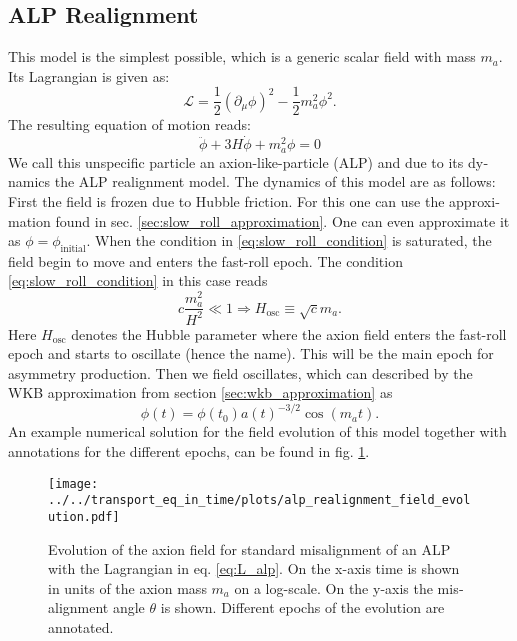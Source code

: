 \documentclass[master,       %
               twoside,        %
               BCOR10mm,       %
               english,ngerman, %
               ]{GAUBM}
\begin{document}
\begin{otherlanguage}{english}
\section{ALP Realignment}
This model is the simplest possible, which is a generic scalar field with mass $m_a$. Its Lagrangian is given as:
\begin{equation}
	\mathcal{L} = \frac{1}{2} \left( \partial_\mu \phi \right)^2 - \frac{1}{2} m_a^2 \phi^2.
	\label{eq:L_alp}
\end{equation}
The resulting equation of motion reads:
\begin{equation}
	\ddot{\phi} + 3 H \dot{\phi} + m_a^2 \phi = 0
\end{equation}
We call this unspecific particle an axion-like-particle (ALP) and due to its dynamics the ALP realignment model.
The dynamics of this model are as follows:
First the field is frozen due to Hubble friction. For this one can use the approximation found in sec. \ref{sec:slow_roll_approximation}. One can even approximate it as $\phi = \phi_\mathrm{initial}$.
When the condition in \eqref{eq:slow_roll_condition} is saturated, the field begin to move and enters the fast-roll epoch. The condition \eqref{eq:slow_roll_condition} in this case reads
\begin{equation}
	c \frac{m_a^2}{H^2} \ll 1 \Rightarrow H_\mathrm{osc} \equiv \sqrt{c} m_a.
\end{equation}
Here $H_\mathrm{osc}$ denotes the Hubble parameter where the axion field enters the fast-roll epoch and starts to oscillate (hence the name).
This will be the main epoch for asymmetry production.
Then we field oscillates, which can described by the WKB approximation from section \ref{sec:wkb_approximation} as
\begin{equation}
	\phi(t) = \phi(t_0) a(t)^{-3/2} \cos(m_a t).
\end{equation}
An example numerical solution for the field evolution of this model together with annotations for the different epochs, can be found in fig. \ref{fig:alp_realignment_time_evolution}.
\begin{figure}[H]
	\label{fig:alp_realignment_time_evolution}
    \texttt{[image: ../../transport\_eq\_in\_time/plots/alp\_realignment\_field\_evolution.pdf]}
    \caption{Evolution of the axion field for standard misalignment of an ALP with the Lagrangian in eq. \eqref{eq:L_alp}. On the x-axis time is shown in units of the axion mass $m_a$ on a log-scale. On the y-axis the misalignment angle $\theta$ is shown. Different epochs of the evolution are annotated.}

\end{figure}
\end{otherlanguage}
\end{document}
